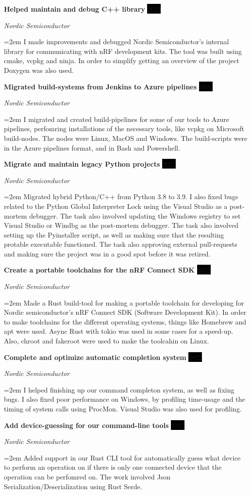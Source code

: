 \documentclass[paper=a4,fontsize=11pt,norsk]{scrartcl} %
\newcommand{\EducationEntry}[4]{
		\noindent \textbf{#1} \hfill      %
		\colorbox{Black}{%
			\parbox{6em}{%
			\hfill\color{White}#2}} \par  %
		\noindent \textit{#3} \par        %
		\noindent\hangindent=2em\hangafter=0 \small #4 %
		\normalsize \par}
\newcommand{\WorkEntry}[4]{				  %
		\noindent \textbf{#1} \hfill      %
		\colorbox{Black}{\color{White}#2} \par  %
		\noindent \textit{#3} \par              %
		\noindent\hangindent=2em\hangafter=0 \small #4 %
		\normalsize \par}
\begin{document}
\WorkEntry{Helped maintain and debug C++ library}{2020}{Nordic Semiconductor} {
I made improvements and debugged Nordic Semiconductor's internal library for
communicating with nRF development kits. The tool was built using cmake, vcpkg
and ninja. In order to simplify getting an overview of the project Doxygen was
also used.
}


\WorkEntry{Migrated build-systems from Jenkins to Azure pipelines}{2020}{Nordic Semiconductor}
{I migrated and created build-pipelines for some of our tools to Azure
pipelines, perfomring installations of the necessary tools, like vcpkg on
Microsoft build-nodes. The nodes were Linux, MacOS and Windows. The
build-scripts were in the Azure pipelines format, and in Bash and Powershell.
}



\WorkEntry{Migrate and maintain legacy Python projects}{2021}{Nordic Semiconductor}
{Migrated hybrid Python/C++ from Python 3.8 to 3.9. I also fixed bugs related to
the Python Global Interpreter Lock using the Visual Studio as a post-mortem
debugger. The task also involved updating the Windows registry to set Visual
Studio or Windbg as the post-mortem debugger. The task also involved setting up
the Pyinstaller script, as well as making sure that the resulting protable
executable functioned. The task also approving external pull-requests and
making sure the project was in a good spot before it was retired.
}



\WorkEntry{Create a portable toolchains for the nRF Connect SDK}{2022}{Nordic Semiconductor}
{
Made a Rust build-tool for making a portable toolchain for developing for
Nordic semiconductor's nRF Connect SDK (Software Development Kit). In order to
make toolchains for the different operating systems, things like Homebrew and
apt were used. Async Rust with tokio was used in some cases for a speed-up.
Also, chroot and fakeroot were used to make the toolcahin on Linux.
}

\WorkEntry{Complete and optimize automatic completion system}{2022}{Nordic Semiconductor}
{
    I helped finishing up our command completon system, as well as fixing bugs.
    I also fixed poor performance on Windows, by profiling time-usage and the
    timing of system calls using ProcMon. Visual Studio was also used for
    profiling.
}


\WorkEntry{Add device-guessing for our command-line tools}{2023}{Nordic Semiconductor}
{
Added support in our Rust CLI tool for automatically guess what device to
perform an operation on if there is only one connected device that the
operation can be perfomred on. The work involved Json Serialization/Deserialization using Rust Serde.
}
\end{document}
